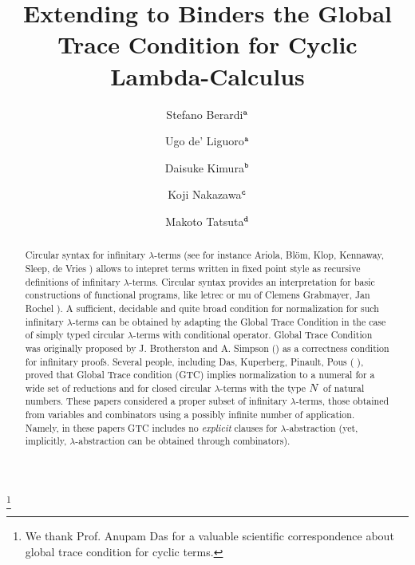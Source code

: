 \documentclass[twoside,11pt]{entics}
\begin{document}
\begin{frontmatter}

  \title{Extending to Binders
  the Global Trace Condition for Cyclic Lambda-Calculus} 
  
 \thanks[ALL]{We thank Prof. Anupam Das for a valuable scientific correspondence about 
 global trace condition for cyclic terms.}   %
  \author{Stefano Berardi$^{\tt a}$}	%
   \author{Ugo de' Liguoro$^{\tt a}$}		%
    \author{Daisuke Kimura$^{\tt b}$}
      \author{Koji Nakazawa$^{\tt c}$}
       \author{Makoto Tatsuta$^{\tt d}$}
   \address[a]{Computer Science Department, Turin University, Torino, Italy}  							
   \address[b]{Department of Information Science, Toho University, Japan} 
   \address[c]{Graduate School of Informatics, Nagoya University, Japan}
   \address[d]{National Institute of Informatics/Sokendai, Tokyo, Japan}
 
 

\begin{abstract} 
Circular syntax for infinitary $\lambda$-terms 
(see for instance Ariola, Bl\"{o}m, Klop, Kennaway, Sleep, de Vries 
\cite{ARIOLA1997154,10.1007/BFb0014548,KENNAWAY199793}) 
allows to intepret terms written in fixed point style 
as recursive definitions of
infinitary $\lambda$-terms. Circular syntax provides an 
interpretation for basic constructions of functional programs, 
like letrec or mu of Clemens Grabmayer, Jan Rochel 
\cite{Letrec,Letmu,JanRochelPhd2016}).
A sufficient, decidable and quite broad condition for normalization for such 
infinitary $\lambda$-terms can be obtained
by adapting the Global Trace Condition in the case of simply typed 
circular $\lambda$-terms with conditional operator. 
Global Trace Condition was
originally proposed by J. Brotherston and A. Simpson
(\cite{BrotherstonPhd2006,BrotherstonSimpson2011})
as a correctness condition for infinitary proofs.
Several people, including Das, Kuperberg, Pinault, Pous 
(\cite{2021-Anupam-Das,2021-Anupam-Das,DBLP:conf/fscd/000221,DBLP:conf/lics/Curzi022,DBLP:conf/csl/Curzi023,DBLP:conf/lics/Curzi023} ), 
proved that Global Trace condition (GTC) implies normalization to a numeral 
for a wide set of reductions
and for closed circular $\lambda$-terms with the type ${N}$ of natural numbers. 
These papers considered 
a proper subset of infinitary $\lambda$-terms, those
obtained from variables and combinators using a possibly infinite number of application.
Namely, in these papers GTC includes no \emph{explicit} clauses for $\lambda$-abstraction
(yet, implicitly, $\lambda$-abstraction can be obtained through combinators).


\end{abstract}
\end{frontmatter}
\end{document}
